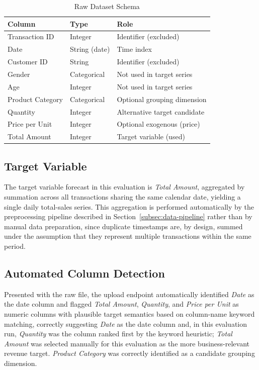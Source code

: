 \begin{table}[!t]
\caption{Raw Dataset Schema}
\label{tab:dataset-features}
\centering
\begin{tabular}{@{}p{2.1cm}p{2.7cm}p{2.6cm}@{}}
\toprule
\textbf{Column} & \textbf{Type} & \textbf{Role} \\
\midrule
Transaction ID & Integer & Identifier (excluded) \\
Date & String (date) & Time index \\
Customer ID & String & Identifier (excluded) \\
Gender & Categorical & Not used in target series \\
Age & Integer & Not used in target series \\
Product Category & Categorical & Optional grouping dimension \\
Quantity & Integer & Alternative target candidate \\
Price per Unit & Integer & Optional exogenous (price) \\
Total Amount & Integer & Target variable (used) \\
\bottomrule
\end{tabular}
\end{table}

\subsection{Target Variable}
The target variable forecast in this evaluation is \emph{Total Amount}, aggregated by summation across all transactions sharing the same calendar date, yielding a single daily total-sales series. This aggregation is performed automatically by the preprocessing pipeline described in Section~\ref{subsec:data-pipeline} rather than by manual data preparation, since duplicate timestamps are, by design, summed under the assumption that they represent multiple transactions within the same period.

\subsection{Automated Column Detection}
Presented with the raw file, the upload endpoint automatically identified \emph{Date} as the date column and flagged \emph{Total Amount}, \emph{Quantity}, and \emph{Price per Unit} as numeric columns with plausible target semantics based on column-name keyword matching, correctly suggesting \emph{Date} as the date column and, in this evaluation run, \emph{Quantity} was the column ranked first by the keyword heuristic; \emph{Total Amount} was selected manually for this evaluation as the more business-relevant revenue target. \emph{Product Category} was correctly identified as a candidate grouping dimension.

